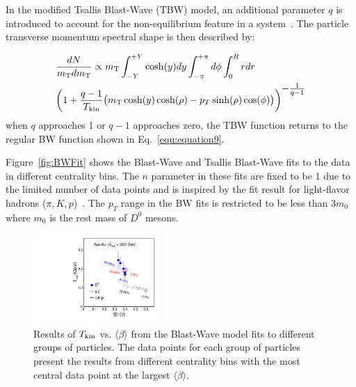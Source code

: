 \documentclass[%
 reprint,	
 amsmath,amssymb,
 aps,
 prc,
]{revtex4-1}
\begin{document}
In the modified Tsallis Blast-Wave (TBW) model, an additional parameter $q$ is introduced to account for the non-equilibrium feature in a system~\cite{Tang:2008ud}. The particle transverse momentum spectral shape is then described by: 

\begin{equation}
  \begin{aligned}
    & \frac{dN}{m_{\rm T}dm_{\rm T}} \propto m_{\rm T}\int_{-Y}^{+Y}\cosh(y)dy \int_{-\pi}^{+\pi} d\phi \int_0^R rdr \\
    & \bigg(1+\frac{q-1}{T_{\rm kin}}\big(m_{\rm T}\cosh(y)\cosh(\rho)-p_{T}\sinh(\rho)\cos(\phi)\big)\bigg)^{\textstyle -\frac{1}{q-1}}
  \end{aligned}
\label{equ:equation10}
\end{equation}
when $q$ approaches 1 or $q-1$ approaches zero, the TBW function returns to the regular BW function shown in Eq.~\ref{equ:equation9}.


Figure~\ref{fig:BWFit} shows the Blast-Wave and Tsallis Blast-Wave fits to the data in different centrality bins. The $n$ parameter in these fits are fixed to be 1 due to the limited number of data points and is inspired by the fit result for light-flavor hadrons ($\pi,K,p$)~\cite{Tang:2008ud}. The $p_{T}$ range in the BW fits is restricted to be less than 3$m_{0}$ where $m_{0}$ is the rest mass of $D^0$ mesons.

\begin{figure}
\centering
\includegraphics[width=0.43\textwidth]{fig/TvsBeta.pdf}
\caption{Results of $T_{\rm kin}$ vs. $\langle\beta\rangle$ from the Blast-Wave model fits to different groups of particles. The data points for each group of particles present the results from different centrality bins with the most central data point at the largest $\langle\beta\rangle$.}
\label{fig:BWFitSummary} 
\end{figure}
\end{document}
